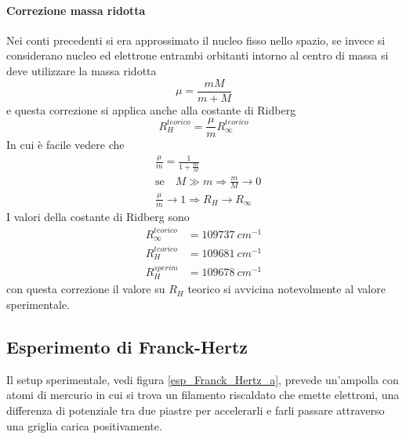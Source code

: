 \paragraph{Correzione massa ridotta} Nei conti precedenti si era approssimato il nucleo fisso nello spazio, se invece si considerano nucleo ed elettrone entrambi orbitanti intorno al centro di massa si deve utilizzare la massa ridotta
\begin{equation}
\mu = \frac{ m M}{m + M }
\end{equation}
e questa correzione si applica anche alla costante di Ridberg
\begin{equation}
R_H^{teorico} = \frac{ \mu}{ m} R_{\infty}^{teorico}
\end{equation}
In cui è facile vedere che 
\begin{equation}
\begin{split}
& \frac{ \mu}{m } = \frac{ 1}{1 + \frac{ m}{M } } \\
& \mbox{se}\quad M \gg m  \Rightarrow \frac{ m}{M } \to 0 \\
& \frac{ \mu}{m }\to 1 \Rightarrow R_H \to R_{\infty}
\end{split}
\end{equation}
I valori della costante di Ridberg sono
\begin{equation}
\begin{split}
R_{\infty}^{teorico} & = \SI{109737}{cm^{-1}} \\
R_{H}^{teorico} & = \SI{109681}{cm^{-1}} \\
R_{H}^{sperim} & = \SI{109678}{cm^{-1}}
\end{split}
\end{equation}
con questa correzione il valore su $R_H$ teorico si avvicina notevolmente al valore sperimentale.


\subsection{Esperimento di Franck-Hertz}
Il setup sperimentale, vedi figura \ref{esp_Franck_Hertz_a}, prevede un'ampolla con atomi di mercurio in cui si trova un filamento riscaldato che emette elettroni, una differenza di potenziale tra due piastre per accelerarli e farli passare attraverso una griglia carica positivamente.
